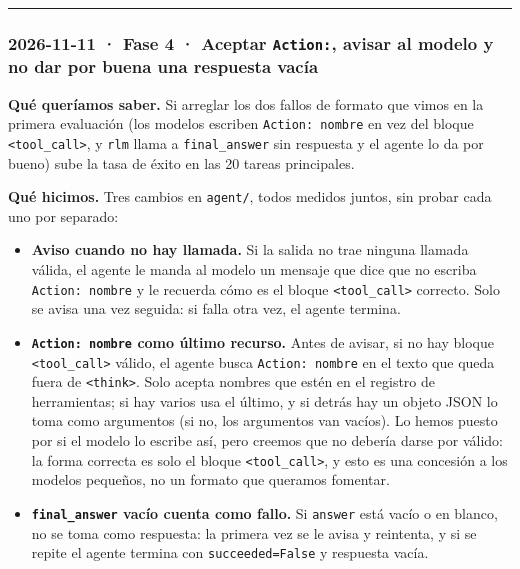 \begin{center}\rule{0.5\linewidth}{0.5pt}\end{center}

\subsubsection{\texorpdfstring{2026-11-11 · Fase 4 · Aceptar \texttt{Action:}, avisar al modelo y no dar por buena una respuesta vacía}{2026-11-11 · Fase 4 · Aceptar Action:, avisar al modelo y no dar por buena una respuesta vacía}}

\textbf{Qué queríamos saber.} Si arreglar los dos fallos de formato que vimos en la primera evaluación (los
modelos escriben \texttt{Action: nombre} en vez del bloque \texttt{\textless{}tool\_\allowbreak{}call\textgreater{}}, y \texttt{rlm} llama a \texttt{final\_\allowbreak{}answer} sin
respuesta y el agente lo da por bueno) sube la tasa de éxito en las 20 tareas principales.

\textbf{Qué hicimos.} Tres cambios en \texttt{agent/\allowbreak{}}, todos medidos juntos, sin probar cada uno por separado:

\begin{itemize}
\tightlist
\item
  \textbf{Aviso cuando no hay llamada.} Si la salida no trae ninguna llamada válida, el agente le manda al
  modelo un mensaje que dice que no escriba \texttt{Action: nombre} y le recuerda cómo es el bloque
  \texttt{\textless{}tool\_\allowbreak{}call\textgreater{}} correcto. Solo se avisa una vez seguida: si falla otra vez, el agente termina.
\item
  \textbf{\texttt{Action: nombre} como último recurso.} Antes de avisar, si no hay bloque
  \texttt{\textless{}tool\_\allowbreak{}call\textgreater{}} válido, el agente busca \texttt{Action: nombre} en el texto que queda fuera de \texttt{\textless{}think\textgreater{}}. Solo
  acepta nombres que estén en el registro de herramientas; si hay varios usa el último, y si detrás hay
  un objeto JSON lo toma como argumentos (si no, los argumentos van vacíos). Lo hemos puesto por si el
  modelo lo escribe así, pero creemos que no debería darse por válido: la forma correcta es solo el bloque
  \texttt{\textless{}tool\_\allowbreak{}call\textgreater{}}, y esto es una concesión a los modelos pequeños, no un formato que queramos fomentar.
\item
  \textbf{\texttt{final\_\allowbreak{}answer} vacío cuenta como fallo.} Si \texttt{answer} está vacío o en blanco, no se toma como
  respuesta: la primera vez se le avisa y reintenta, y si se repite el agente termina con
  \texttt{succeeded=\allowbreak{}False} y respuesta vacía.
\end{itemize}

